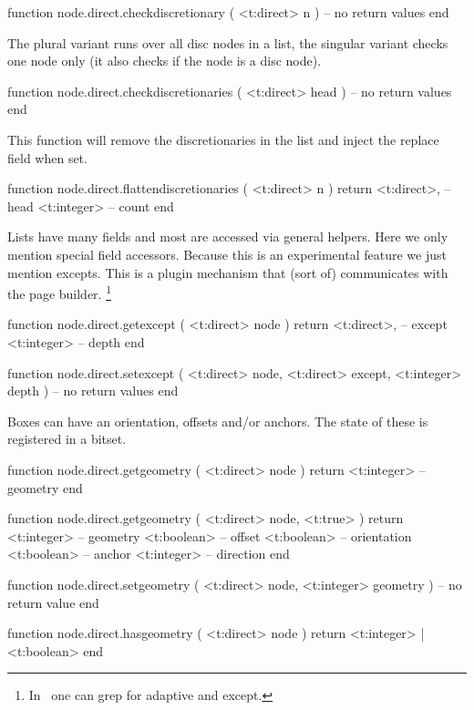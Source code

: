 \starttyping[option=LUA]
function node.direct.checkdiscretionary ( <t:direct> n )
    -- no return values
end
\stoptyping

The plural variant runs over all disc nodes in a list, the singular variant
checks one node only (it also checks if the node is a disc node).

\starttyping[option=LUA]
function node.direct.checkdiscretionaries ( <t:direct> head )
    -- no return values
end
\stoptyping

This function will remove the discretionaries in the list and inject the replace
field when set.

\starttyping[option=LUA]
function node.direct.flattendiscretionaries ( <t:direct> n )
    return
        <t:direct>, -- head
        <t:integer> -- count
end
\stoptyping

\stopsubsection

\startsubsection[title={Boxes}]

Lists have many fields and most are accessed via general helpers. Here we only
mention special field accessors. Because this is an experimental feature we just
mention excepts. This is a plugin mechanism that (sort of) communicates with the
page builder. \footnote {In \CONTEXT\ one can grep for adaptive and except.}

\starttyping[option=LUA]
function node.direct.getexcept (
    <t:direct> node
)
    return
        <t:direct>, -- except
        <t:integer> -- depth
end

function node.direct.setexcept (
    <t:direct>  node,
    <t:direct>  except,
    <t:integer> depth
)
    -- no return values
end
\stoptyping

Boxes can have an orientation, offsets and/or anchors. The state of these is
registered in a  bitset.

\starttyping[option=LUA]
function node.direct.getgeometry (
    <t:direct> node
)
    return <t:integer> -- geometry
end

function node.direct.getgeometry (
    <t:direct> node,
    <t:true>
)
    return
        <t:integer> -- geometry
        <t:boolean> -- offset
        <t:boolean> -- orientation
        <t:boolean> -- anchor
        <t:integer> -- direction
end

function node.direct.setgeometry (
    <t:direct>  node,
    <t:integer> geometry
)
    -- no return value
end

function node.direct.hasgeometry (
    <t:direct> node
)
    return <t:integer> | <t:boolean>
end
\stoptyping

